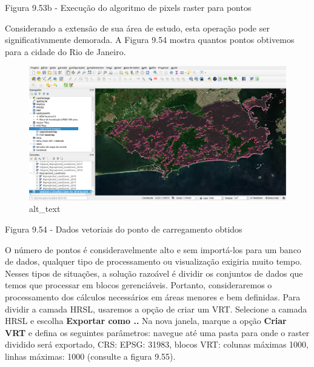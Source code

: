 \documentclass[
]{book}
\begin{document}
Figura 9.53b - Execução do algoritmo de pixels raster para pontos

Considerando a extensão de sua área de estudo, esta operação pode ser significativamente demorada. A Figura 9.54 mostra quantos pontos obtivemos para a cidade do Rio de Janeiro.

\begin{figure}
\centering
\includegraphics{media/modulo9/fig954.png}
\caption{alt\_text}
\end{figure}

Figura 9.54 - Dados vetoriais do ponto de carregamento obtidos

O número de pontos é consideravelmente alto e sem importá-los para um banco de dados, qualquer tipo de processamento ou visualização exigiria muito tempo. Nesses tipos de situações, a solução razoável é dividir os conjuntos de dados que temos que processar em blocos gerenciáveis. Portanto, consideraremos o processamento dos cálculos necessários em áreas menores e bem definidas. Para dividir a camada HRSL, usaremos a opção de criar um VRT. Selecione a camada HRSL e escolha \textbf{Exportar como ..} Na nova janela, marque a opção \textbf{Criar VRT} e defina os seguintes parâmetros: navegue até uma pasta para onde o raster dividido será exportado, CRS: EPSG: 31983, blocos VRT: colunas máximas 1000, linhas máximas: 1000 (consulte a figura 9.55).
\end{document}

